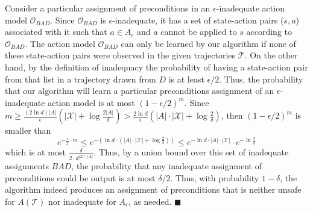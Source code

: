 \documentclass{article}
\newenvironment{proof}{\noindent{\bf Proof:~~}}{\qed}
\newcommand{\qed}{\hfill\ensuremath{\blacksquare}}
\begin{document}
\begin{proof}
		
		Consider a particular assignment of preconditions in an $\epsilon$-inadequate action model $\mathcal{O}_{BAD}$. Since $\mathcal{O}_{BAD}$ is $\epsilon$-inadequate, 
		it has a set of state-action pairs ($s,a$) associated with it such that $a\in A_\epsilon$ and $a$ cannot be applied to $s$ according to $\mathcal{O}_{BAD}$. 
		The action model $\mathcal{O}_{BAD}$ can only be learned by our algorithm 
		if none of these state-action pairs were observed in the given trajectories $\mathcal{T}$. 
		On the other hand, by the definition of inadequacy
		the probability of having a state-action pair from that list 
		in a trajectory drawn from $D$ is at least $\epsilon/2$. 
		Thus, the probability that our algorithm will learn a particular preconditions assignment of an $\epsilon$-inadequate action model is at most $(1-\epsilon/2)^m$.
		Since $m\geq\frac{(2\ln  d)|A|}{\epsilon}(|\mathcal{X}|+\log\frac{2|A|}{\delta})>\frac{2\ln d}{\epsilon}(|A|\cdot |\mathcal{X}|+\log\frac{2}{\delta})$, then $(1-\epsilon/2)^m$ is smaller than 	
		\begin{equation}
		e^{-\frac{\epsilon}{2} \cdot m}
		\leq 
		e^{-(\ln d \cdot (|A|\cdot |\mathcal{X}|+\log\frac{2}{\delta}))}
		\leq e^{-\ln d \cdot |A|\cdot |\mathcal{X}|}\cdot e^{-\ln  \frac{2}{\delta}}
		\end{equation}
		which is at most $\frac{\delta}{2\cdot d^{|\mathcal{X}|\cdot |A|}}$. Thus, by a union bound over this set of inadequate assignments $BAD$, the probability that any inadequate assignment of preconditions could be output is at most $\delta/2$.
		Thus, with probability $1-\delta$, the algorithm indeed produces an assignment of preconditions that is neither unsafe for $A(\mathcal{T})$ nor inadequate for $A_\epsilon$, as needed.
	\end{proof}
	
\end{document}
